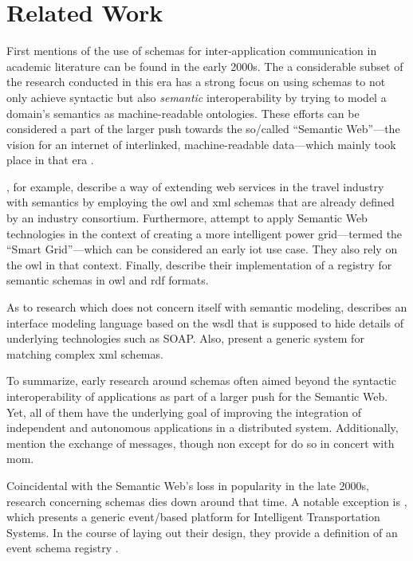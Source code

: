 
\section{Related Work}\label{sec:related-work}

First mentions of the use of schemas for inter-application communication in academic literature can be found in the early 2000s.
The a considerable subset of the research conducted in this era has a strong focus on using schemas to not only achieve syntactic but also \emph{semantic} interoperability by trying to model a domain's semantics as machine-readable ontologies.
These efforts can be considered a part of the larger push towards the so\-/called \enquote{Semantic Web}---the vision for an internet of interlinked, machine-readable data---which mainly took place in that era \parencite{noauthor_semantic_nodate}.

\cite{dogac_semantically_2004}, for example, describe a way of extending web services in the travel industry with semantics by employing the \gls{owl} and \gls{xml} schemas that are already defined by an industry consortium.
Furthermore, \cite{crapo_semantically_2009} attempt to apply Semantic Web technologies in the context of creating a more intelligent power grid---termed the \enquote{Smart Grid}---which can be considered an early \gls{iot} use case. They also rely on the \gls{owl} in that context.
Finally, \cite{heery_metadata_2003} describe their implementation of a registry for semantic schemas in \gls{owl} and \gls{rdf} formats.

As to research which does not concern itself with semantic modeling, \cite{duftler_web_2001} describes an interface modeling language based on the \gls{wsdl} that is supposed to hide details of underlying technologies such as SOAP.
Also, \cite{do_matching_2007} present a generic system for matching complex \gls{xml} schemas.

To summarize, early research around schemas often aimed beyond the syntactic interoperability of applications as part of a larger push for the Semantic Web.
Yet, all of them have the underlying goal of improving the integration of independent and autonomous applications in a distributed system.
Additionally, \cites{duftler_web_2001}{dogac_semantically_2004}{li_semantic_2004}{crapo_semantically_2009} mention the exchange of messages, though non except for \cite{li_semantic_2004} do so in concert with \gls{mom}.

Coincidental with the Semantic Web's loss in popularity in the late 2000s, research concerning schemas dies down around that time.
A notable exception is \cite{ma_iip_2010}, which presents a generic event\-/based platform for Intelligent Transportation Systems.
In the course of laying out their design, they provide a definition of an event schema registry \parencite[see][p.~3]{ma_iip_2010}.

